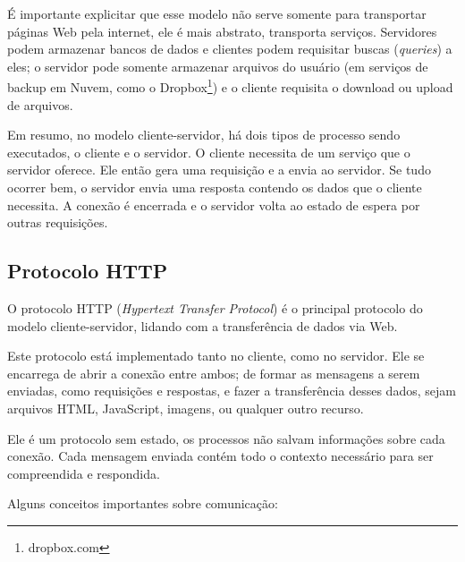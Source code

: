 \documentclass[a4paper,12pt]{article}
\begin{document}
É importante explicitar que esse modelo não serve somente para transportar páginas Web pela internet, ele é mais abstrato, transporta serviços. Servidores podem armazenar bancos de dados e clientes podem requisitar buscas (\emph{queries}) a eles; o servidor pode somente armazenar arquivos do usuário (em serviços de backup em Nuvem, como o Dropbox\footnote{dropbox.com}) e o cliente requisita o download ou upload de arquivos.

Em resumo, no modelo cliente-servidor, há dois tipos de processo sendo executados, o cliente e o servidor. O cliente necessita de um serviço que o servidor oferece. Ele então gera uma requisição e a envia ao servidor. Se tudo ocorrer bem, o servidor envia uma resposta contendo os dados que o cliente necessita. A conexão é encerrada e o servidor volta ao estado de espera por outras requisições.

\subsection{Protocolo HTTP}

O protocolo HTTP (\emph{Hypertext Transfer Protocol}) é o principal protocolo do modelo cliente-servidor, lidando com a transferência de dados via Web.

Este protocolo está implementado tanto no cliente, como no servidor. Ele se encarrega de abrir a conexão entre ambos; de formar as mensagens a serem enviadas, como requisições e respostas, e fazer a transferência desses dados, sejam arquivos HTML, JavaScript, imagens, ou qualquer outro recurso.

Ele é um protocolo sem estado, os processos não salvam informações sobre cada conexão. Cada mensagem enviada contém todo o contexto necessário para ser compreendida e respondida.

Alguns conceitos importantes sobre comunicação:
\end{document}
